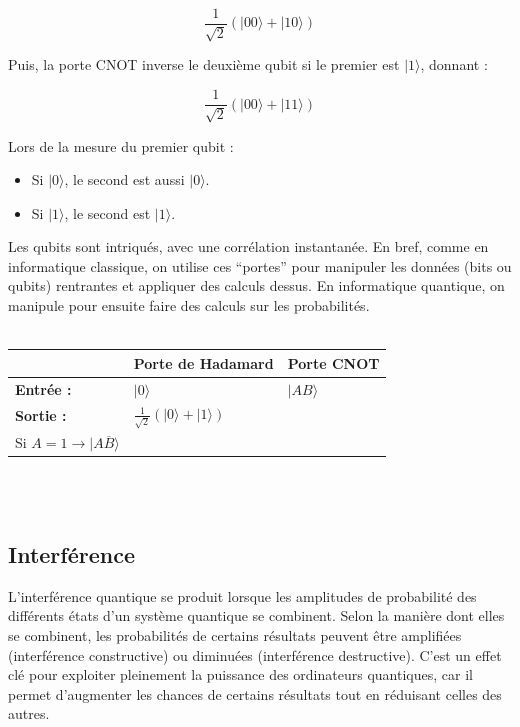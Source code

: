 \documentclass{article}
\begin{document}
\[ \frac{1}{\sqrt{2}}(|00\rangle + |10\rangle) \]

Puis, la porte CNOT inverse le deuxième qubit si le premier est $|1\rangle$, donnant :

\[ \frac{1}{\sqrt{2}}(|00\rangle + |11\rangle) \]

Lors de la mesure du premier qubit :
\medskip
\begin{itemize}
    \item Si $|0\rangle$, le second est aussi $|0\rangle$.
    \item Si $|1\rangle$, le second est $|1\rangle$.
\end{itemize}
\medskip
Les qubits sont intriqués, avec une corrélation instantanée.
\medskip
En bref, comme en informatique classique, on utilise ces “portes” pour manipuler les données (bits ou qubits) rentrantes et appliquer des calculs dessus. En informatique quantique, on manipule pour ensuite faire des calculs sur les probabilités.
\medskip
\\ \\ 

\begin{tabularx}{\textwidth}{|X|X|X|}
  \hline
  \textbf{} & \textbf{Porte de Hadamard} & \textbf{Porte CNOT} \\
  \hline
  \textbf{Entrée : } & $|0\rangle$ & $|AB\rangle$ \\
  \hline
  \textbf{Sortie : } & $\frac{1}{\sqrt{2}}(|0\rangle + |1\rangle)$ & 
  \begin{tabular}{@{}l@{}} 
      Si $A = 0 \rightarrow |AB\rangle$ \\ 
      Si $A = 1 \rightarrow |A\overline{B}\rangle$ 
  \end{tabular} \\
  \hline
\end{tabularx}
\\ \\ 

\subsection{Interférence}

L'interférence quantique se produit lorsque les amplitudes de probabilité des différents états d'un système quantique se combinent. Selon la manière dont elles se combinent, les probabilités de certains résultats peuvent être amplifiées (interférence constructive) ou diminuées (interférence destructive). C’est un effet clé pour exploiter pleinement la puissance des ordinateurs quantiques, car il permet d’augmenter les chances de certains résultats tout en réduisant celles des autres.
\end{document}
